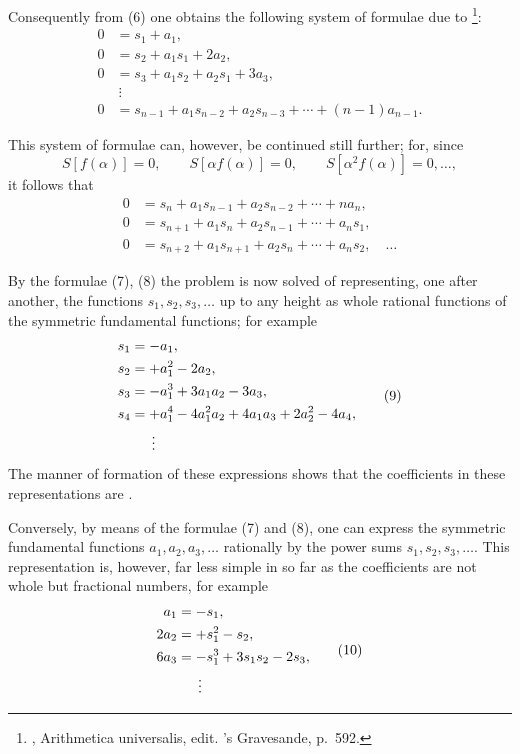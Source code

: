 
Consequently from (6) one obtains the following system of formulae due to \footnote[1]{, Arithmetica universalis, edit. 's Gravesande, p.~592.}:
\begin{equation}
\begin{aligned}
0&=s_1+a_1,\\
0&=s_2+a_1s_1+2a_2,\\
0&=s_3+a_1s_2+a_2s_1+3a_3,\\
&\ \vdots\\
0&=s_{n-1}+a_1s_{n-2}+a_2s_{n-3}+\cdots+(n-1)a_{n-1}.
\end{aligned}
\tag{7}
\end{equation}

This system of formulae can, however, be continued still further; for, since
\[
 S[f(\alpha)]=0,\qquad S[\alpha f(\alpha)]=0,\qquad S[\alpha^2f(\alpha)]=0,\ldots,
\]
it follows that
\begin{equation}
\begin{aligned}
0&=s_n+a_1s_{n-1}+a_2s_{n-2}+\cdots+n a_n,\\
0&=s_{n+1}+a_1s_n+a_2s_{n-1}+\cdots+a_ns_1,\\
0&=s_{n+2}+a_1s_{n+1}+a_2s_n+\cdots+a_ns_2,\quad\ldots
\end{aligned}
\tag{8}
\end{equation}

By the formulae (7), (8) the problem is now solved of representing, one after another, the functions $s_1,s_2,s_3,\ldots$ up to any height as whole rational functions of the symmetric fundamental functions; for example
\begin{equation}
\begin{aligned}
 s_1&=-a_1,\\
 s_2&=+a_1^2-2a_2,\\
 s_3&=-a_1^3+3a_1a_2-3a_3,\\
 s_4&=+a_1^4-4a_1^2a_2+4a_1a_3+2a_2^2-4a_4,\\
 &\hspace{1.5em}\vdots
\end{aligned}
\tag{9}
\end{equation}
The manner of formation of these expressions shows that the coefficients in these representations are .

Conversely, by means of the formulae (7) and (8), one can express the symmetric fundamental functions $a_1,a_2,a_3,\ldots$ rationally by the power sums $s_1,s_2,s_3,\ldots$. This representation is, however, far less simple in so far as the coefficients are not whole but fractional numbers, for example
\begin{equation}
\begin{aligned}
 a_1&=-s_1,\\
 2a_2&=+s_1^2-s_2,\\
 6a_3&=-s_1^3+3s_1s_2-2s_3,\\
 &\hspace{1.5em}\vdots
\end{aligned}
\tag{10}
\end{equation}
